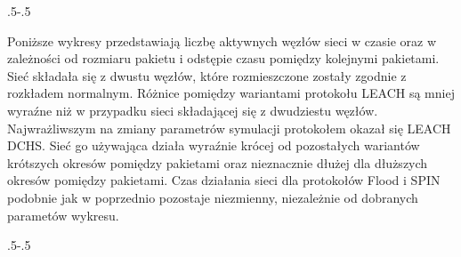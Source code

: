  {\pdfpagewidth
    \vspace*{-2cm}
    \noindent\kern.5\pdfpagewidth{}\kern-.5\pdfpagewidth
     \par
     \vspace*{-5cm}
\clearpage
\thispagestyle{empty}
    \vspace*{-2cm}
    \noindent\parbox{\textwidth}{%
    \noindent{}\endgraf
    \vspace{2ex}%
    }
     \par
     \vspace*{-5cm}
\clearpage
}

Poniższe wykresy przedstawiają liczbę aktywnych węzłów sieci w czasie oraz w zależności od rozmiaru pakietu i odstępie czasu pomiędzy kolejnymi pakietami. Sieć składała się z dwustu węzłów, które rozmieszczone zostały zgodnie z rozkładem normalnym. Różnice pomiędzy wariantami protokołu LEACH są mniej wyraźne niż w przypadku sieci składającej się z dwudziestu węzłów. Najwrażliwszym na zmiany parametrów symulacji protokołem okazał się LEACH DCHS. Sieć go używająca działa wyraźnie krócej od pozostałych wariantów krótszych okresów pomiędzy pakietami oraz nieznacznie dłużej dla dłuższych okresów pomiędzy pakietami. Czas działania sieci dla protokołów Flood i SPIN podobnie jak w poprzednio pozostaje niezmienny, niezależnie od dobranych parametów wykresu.

\clearpage
\thispagestyle{empty}

{\pdfpagewidth
    \vspace*{-2cm}
    \noindent\kern.5\pdfpagewidth{}\kern-.5\pdfpagewidth
     \par
     \vspace*{-5cm}
\clearpage
\thispagestyle{empty}
    \vspace*{-2cm}
    \noindent\parbox{\textwidth}{%
    \noindent{}\endgraf
    \vspace{2ex}%
    }
     \par
     \vspace*{-5cm}
\clearpage
}

